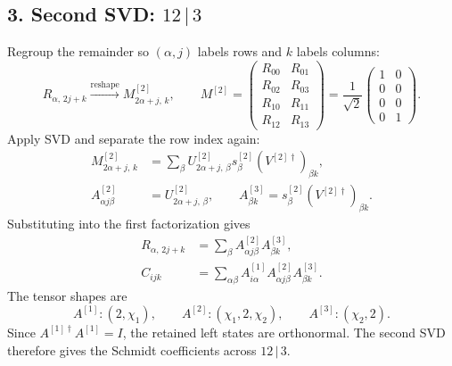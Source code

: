 \documentclass[11pt]{article}
\begin{document}
\newpage
\subsection*{3. Second SVD: $12\,|\,3$}
Regroup the remainder so $(\alpha,j)$ labels rows and $k$ labels columns:
\begin{equation}
R_{\alpha,\,2j+k}\xrightarrow{\text{reshape}}M^{[2]}_{2\alpha+j,\,k},\qquad
M^{[2]}=\begin{pmatrix}R_{00}&R_{01}\\R_{02}&R_{03}\\R_{10}&R_{11}\\R_{12}&R_{13}\end{pmatrix}
=\frac1{\sqrt2}\begin{pmatrix}1&0\\0&0\\0&0\\0&1\end{pmatrix}.
\end{equation}
Apply SVD and separate the row index again:
\begin{align}
M^{[2]}_{2\alpha+j,\,k}
&=\sum_\beta U^{[2]}_{2\alpha+j,\,\beta}s^{[2]}_\beta
(V^{[2]\dagger})_{\beta k},\\
A^{[2]}_{\alpha j\beta}&=U^{[2]}_{2\alpha+j,\,\beta},
\qquad A^{[3]}_{\beta k}=s^{[2]}_\beta(V^{[2]\dagger})_{\beta k}.
\end{align}
Substituting into the first factorization gives
\begin{align}
R_{\alpha,\,2j+k}&=\sum_\beta A^{[2]}_{\alpha j\beta}A^{[3]}_{\beta k},\\
C_{ijk}&=\sum_{\alpha\beta}A^{[1]}_{i\alpha}A^{[2]}_{\alpha j\beta}A^{[3]}_{\beta k}.
\end{align}
The tensor shapes are
\begin{equation}
A^{[1]}:(2,\chi_1),\qquad A^{[2]}:(\chi_1,2,\chi_2),\qquad A^{[3]}:(\chi_2,2).
\end{equation}
Since $A^{[1]\dagger}A^{[1]}=I$, the retained left states are orthonormal. The second SVD therefore gives the Schmidt coefficients across $12\,|\,3$.
\end{document}
